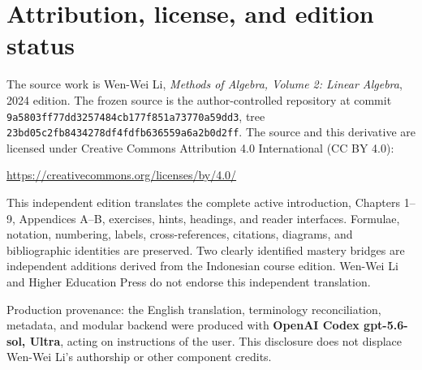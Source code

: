 \documentclass[
  colors=true,
  coverpage=coverpage-en.tex,
  fontsetup=font-setup-en.tex,
  titlesetup=titles-setup-en.tex
]{AJbook2}
\numberwithin{equation}{section}
\numberwithin{figure}{section}
\theoremstyle{plain}
\theoremstyle{nonumberplain}
\begin{document}
\frontmatter

\cleardoublepage
\thispagestyle{empty}
\section*{Attribution, license, and edition status}
The source work is Wen-Wei Li, \emph{Methods of Algebra, Volume 2:
Linear Algebra}, 2024 edition. The frozen source is the author-controlled
repository at commit \texttt{9a5803ff77dd3257484cb177f851a73770a59dd3},
tree \texttt{23bd05c2fb8434278df4fdfb636559a6a2b0d2ff}. The source and this
derivative are licensed under Creative Commons Attribution 4.0 International
(CC BY 4.0):
\begin{center}\small\url{https://creativecommons.org/licenses/by/4.0/}\end{center}

This independent edition translates the complete active introduction,
Chapters 1--9, Appendices A--B, exercises, hints, headings, and reader
interfaces. Formulae, notation, numbering, labels, cross-references,
citations, diagrams, and bibliographic identities are preserved. Two clearly
identified mastery bridges are independent additions derived from the
Indonesian course edition. Wen-Wei Li and Higher Education Press do not endorse
this independent translation.

\medskip
Production provenance: the English translation, terminology reconciliation,
metadata, and modular backend were produced with \textbf{OpenAI Codex
gpt-5.6-sol, Ultra}, acting on instructions of the user. This disclosure does
not displace Wen-Wei Li’s authorship or other component credits.

\mainmatter








\end{document}
